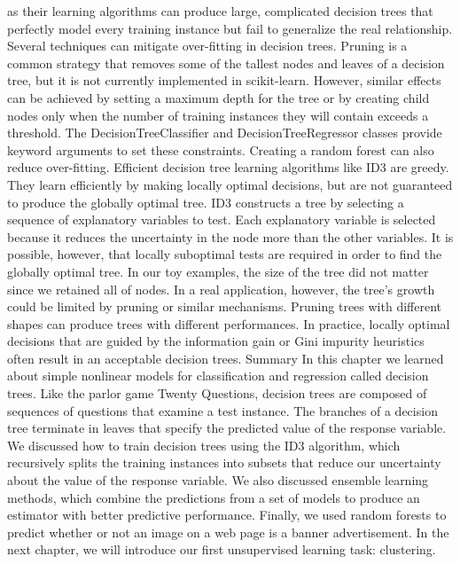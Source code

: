 as their learning algorithms can produce large, complicated decision trees that
perfectly model every training instance but fail to generalize the real relationship.
Several techniques can mitigate over-fitting in decision trees. Pruning is a common
strategy that removes some of the tallest nodes and leaves of a decision tree, but
it is not currently implemented in scikit-learn. However, similar effects can be
achieved by setting a maximum depth for the tree or by creating child nodes only
when the number of training instances they will contain exceeds a threshold. The
DecisionTreeClassifier and DecisionTreeRegressor classes provide keyword
arguments to set these constraints. Creating a random forest can also reduce
over-fitting.
Efficient decision tree learning algorithms like ID3 are greedy. They learn efficiently
by making locally optimal decisions, but are not guaranteed to produce the globally
optimal tree. ID3 constructs a tree by selecting a sequence of explanatory variables
to test. Each explanatory variable is selected because it reduces the uncertainty in the
node more than the other variables. It is possible, however, that locally suboptimal
tests are required in order to find the globally optimal tree.
In our toy examples, the size of the tree did not matter since we retained all of nodes.
In a real application, however, the tree's growth could be limited by pruning or similar
mechanisms. Pruning trees with different shapes can produce trees with different
performances. In practice, locally optimal decisions that are guided by the information
gain or Gini impurity heuristics often result in an acceptable decision trees.
Summary
In this chapter we learned about simple nonlinear models for classification and
regression called decision trees. Like the parlor game Twenty Questions, decision trees
are composed of sequences of questions that examine a test instance. The branches
of a decision tree terminate in leaves that specify the predicted value of the response
variable. We discussed how to train decision trees using the ID3 algorithm, which
recursively splits the training instances into subsets that reduce our uncertainty about
the value of the response variable. We also discussed ensemble learning methods,
which combine the predictions from a set of models to produce an estimator with
better predictive performance. Finally, we used random forests to predict whether or
not an image on a web page is a banner advertisement. In the next chapter, we will
introduce our first unsupervised learning task: clustering.

